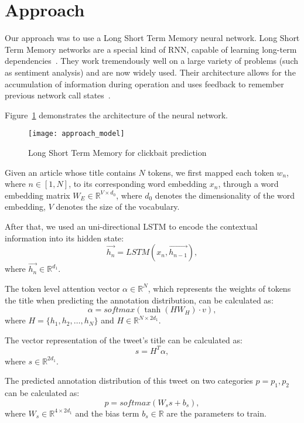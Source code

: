 \section{Approach}
Our approach was to use a Long Short Term Memory neural network. 
Long Short Term Memory networks are a special kind of RNN, capable of learning long-term dependencies~\cite{Hochreiter1997}. 
They work tremendously well on a large variety of problems (such as sentiment analysis) and are now widely used. Their architecture allows for the accumulation of information during operation and uses feedback to remember previous network call states~\cite{Christopher2015}.

Figure~\ref{fig:approach_model} demonstrates the architecture of the neural network.

\begin{figure}[H]
    \centering
    \texttt{[image: approach\_model]}
    \caption{Long Short Term Memory for clickbait
    prediction}
    \label{fig:approach_model}
\end{figure}

Given an article whose title contains $N$ tokens, we first mapped each token $w_n$, where $n \in [1, N]$, to its corresponding word embedding $x_n$, through a word embedding matrix $W_E \in \mathbb{R}^{V \times d_0}$, where $d_0$ denotes the dimensionality of the word embedding, $V$ denotes the size of the vocabulary. 

After that, we used an uni-directional LSTM to encode the contextual information into its hidden state:
\[
    \vec{h_n} = LSTM(x_n, \vec{h_{n-1}}),
\]
where $\vec{h_n} \in \mathbb{R}^{d_1}$.

The token level attention vector $\alpha \in \mathbb{R}^N$, which represents the weights of tokens the title when predicting the annotation distribution, can be calculated as:
\[
    \alpha = softmax(\tanh(H W_H) \cdot v),
\]
where $H = \{ h_1, h_2, \dots, h_N \}$ and $H \in \mathbb{R}^{N \times 2d_1}$.

The vector representation of the tweet’s title can be calculated as:
\[
    s = H^T \alpha,
\]
where $s \in \mathbb{R}^{2d_1}$.

The predicted annotation distribution of this tweet on two categories $p = { p_1, p_2 }$ can be calculated as:
\[
    p = softmax(W_s s + b_s),
\]
where $W_s \in \mathbb{R}^{4\times 2d_1}$ and the bias term $b_s \in \mathbb{R}$ are the parameters to train.
